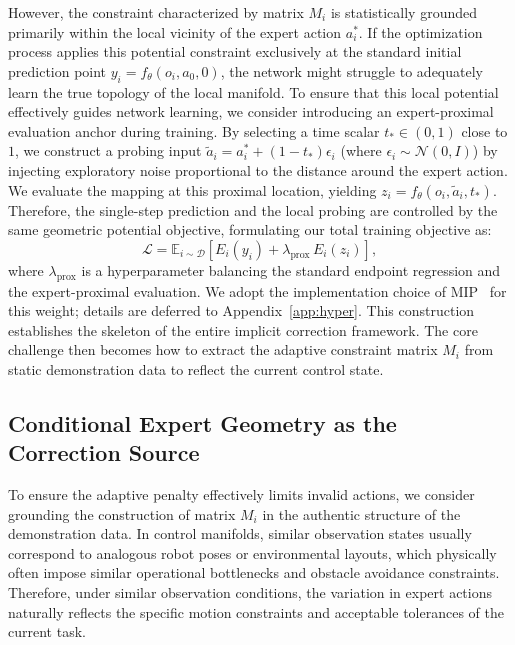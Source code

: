 However, the constraint characterized by matrix \(M_i\) is statistically grounded primarily within the local vicinity of the expert action \(a_i^*\). 
If the optimization process applies this potential constraint exclusively at the standard initial prediction point \(y_i = f_\theta(o_i, a_0, 0)\), 
the network might struggle to adequately learn the true topology of the local manifold. To ensure that this local potential effectively guides network learning, 
we consider introducing an expert-proximal evaluation anchor during training. 
By selecting a time scalar \(t_* \in (0, 1)\) close to \(1\), 
we construct a probing input \(\tilde{a}_i = a_i^* + (1 - t_*)\epsilon_i\) (where \(\epsilon_i \sim \mathcal{N}(0, I)\)) by injecting exploratory noise proportional to the distance around the expert action. 
We evaluate the mapping at this proximal location, yielding \(z_i = f_\theta(o_i, \tilde{a}_i, t_*)\). 
Therefore, the single-step prediction and the local probing are controlled by the same geometric potential objective, 
formulating our total training objective as:
\begin{equation}
    \mathcal{L} = \mathbb{E}_{i \sim \mathcal{D}} \left[ E_i(y_i) + \lambda_{\mathrm{prox}}\, E_i(z_i) \right],
    \label{eq:idp_total_loss}
\end{equation}
where \(\lambda_{\mathrm{prox}}\) is a hyperparameter balancing the standard endpoint regression and the expert-proximal evaluation. We adopt the implementation choice of MIP~\cite{pan2026adonoisingdispellingmyths} for this weight; details are deferred to Appendix~\ref{app:hyper}.
This construction establishes the skeleton of the entire implicit correction framework. 
The core challenge then becomes how to extract the adaptive constraint matrix \(M_i\) from static demonstration data to reflect the current control state.

\subsection{Conditional Expert Geometry as the Correction Source}

To ensure the adaptive penalty effectively limits invalid actions, 
we consider grounding the construction of matrix \(M_i\) in the authentic structure of the demonstration data. 
In control manifolds, similar observation states usually correspond to analogous robot poses or environmental layouts, 
which physically often impose similar operational bottlenecks and obstacle avoidance constraints. 
Therefore, under similar observation conditions, 
the variation in expert actions naturally reflects the specific motion constraints and acceptable tolerances of the current task.


